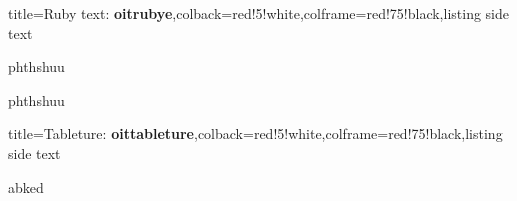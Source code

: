 \documentclass{article}
\begin{document}
\bigskip
\begin{tcblisting}{title={{\sffamily Ruby text: \bfseries\textcolor{blue!10}{oitrubye}}},colback=red!5!white,colframe=red!75!black,listing side text}
\begin{oitrubye}
phthshuu

phthshuu
\end{oitrubye}
\end{tcblisting}

\bigskip
\begin{tcblisting}{title={{\sffamily Tableture: \bfseries\textcolor{blue!10}{oittableture}}},colback=red!5!white,colframe=red!75!black,listing side text}
\begin{oittableture}
abked
\end{oittableture}
\end{tcblisting}


\oitlists

\oitshowconspectus
\end{document}
